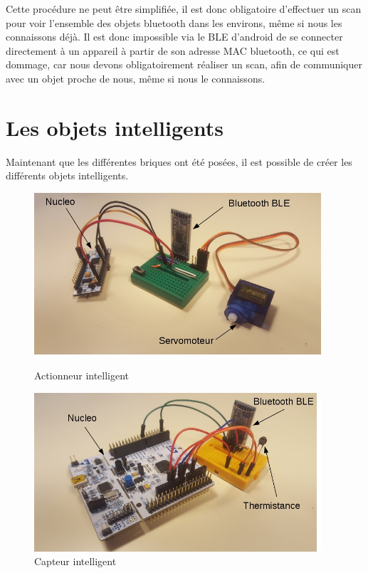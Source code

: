 Cette procédure ne peut être simplifiée, il est donc obligatoire d'effectuer un scan pour voir l'ensemble des 
objets bluetooth dans les environs, même si nous les connaissons déjà. Il est donc impossible via le BLE 
d'android de se connecter directement à un appareil à partir de son adresse MAC bluetooth, ce qui est 
dommage, car nous devons obligatoirement réaliser un scan, afin de communiquer avec un objet 
proche de nous, même si nous le connaissons.


\section{Les objets intelligents}

Maintenant que les différentes briques ont été posées, il est possible de créer les différents objets
intelligents.

\begin{figure}[!tbp]
  \centering
  \begin{minipage}[b]{0.49\textwidth}
    \includegraphics[width=0.95\textwidth]{img/actuator2.jpg}
    \caption{Actionneur intelligent}
    \label{actuator}
  \end{minipage}
  \hfill
  \begin{minipage}[b]{0.49\textwidth}
    \includegraphics[width=0.95\textwidth]{img/sensor2.jpg}
    \caption{Capteur intelligent}
    \label{sensor}
  \end{minipage}
\end{figure}

